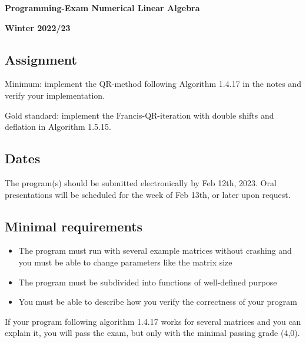 \documentclass[a4paper]{article}
\begin{document}
\begin{center}
  \textbf{\Large Programming-Exam Numerical Linear Algebra}
  
  \textbf{Winter 2022/23}
\end{center}

\subsection*{Assignment}
Minimum: implement the QR-method following Algorithm 1.4.17 in the notes and
verify your implementation.

Gold standard: implement the Francis-QR-iteration with double shifts
and deflation in Algorithm 1.5.15.
\subsection*{Dates}

The program(s) should be submitted electronically by Feb 12th,
2023. Oral presentations will be scheduled for the week of Feb 13th, or later upon request.

\subsection*{Minimal requirements}
\begin{itemize}
\item The program must run with several example matrices without
  crashing and you must be able to change parameters like the matrix
  size
\item The program must be subdivided into functions of well-defined
  purpose
\item You must be able to describe how you verify the correctness of
  your program
\end{itemize}

If your program following algorithm 1.4.17 works for several matrices and you can explain it, you will pass the exam, but only with the minimal passing grade (4,0).
\end{document}
